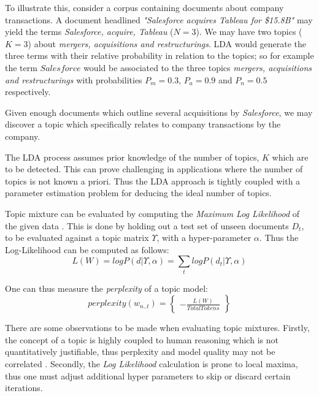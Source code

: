 \documentclass[11pt,journal,final,a4paper]{IEEEtran}
\begin{document}
To illustrate this, consider a corpus containing documents about company transactions. A document headlined \textit{"Salesforce acquires Tableau for \$15.8B"} may yield the terms \textit{Salesforce, acquire, Tableau} ($N=3$). We may have two topics ($K=3$) about \textit{mergers, acquisitions and restructurings}. LDA would generate the three terms with their relative probability in relation to the topics; so for example the term $Salesforce$ would be associated to the three topics \textit{mergers, acquisitions and restructurings} with probabilities $P_{m} = 0.3$, $P_{a} = 0.9$ and $P_{n} = 0.5$ respectively. 

Given enough documents which outline several acquisitions by \textit{Salesforce}, we may discover a topic which specifically relates to company transactions by the company.

The LDA process assumes prior knowledge of the number of topics, $K$ which are to be detected. This can prove challenging in applications where the number of topics is not known a priori. Thus the LDA approach is tightly coupled with a parameter estimation problem for deducing the ideal number of topics. 

Topic mixture can be evaluated by computing the \textit{Maximum Log Likelihood} of the given data \cite{lda:evaluation}. This is done by holding out a test set of unseen documents $D_{t}$, to be evaluated against a topic matrix $\Upsilon$, with a hyper-parameter $\alpha$. Thus the Log-Likelihood can be computed as follows:
\begin{equation}
L(W) = log P(d | \Upsilon , \alpha) = \sum_{t} log P( d_{t} | \Upsilon, \alpha)
\end{equation}

One can thus measure the \textit{perplexity} of a topic model:
\begin{equation}
perplexity(w_{n..t}) = \begin{Bmatrix}
-\frac{L(W)}{Total  Tokens}
\end{Bmatrix}
\end{equation} 

There are some observations to be made when evaluating topic mixtures. Firstly, the concept of a topic is highly coupled to human reasoning which is not quantitatively justifiable, thus perplexity and model quality may not be correlated \cite{lda:human-perplexity}. Secondly, the \textit{Log Likelihood} calculation is prone to local maxima, thus one must adjust additional hyper parameters to skip or discard certain iterations.
\end{document}
